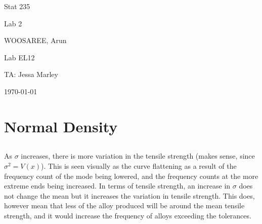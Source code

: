\documentclass[letterpaper]{article}
\begin{document}
\begin{titlepage}
 \begin{center}
  \vspace*{1cm}
  \Huge
  Stat 235
  \vspace{1cm}
  
  Lab 2
  \vspace{1cm}
  
  WOOSAREE, Arun
  \vspace{1cm}
  
  \Huge
  Lab EL12
  \vspace{1cm}
  
  TA: Jessa Marley
  \vspace{1cm}
  
  \today
  \vfill
 \end{center}
\end{titlepage}

\section{Normal Density}

\subsection{}%



As $\sigma$ increases, there is more variation in the tensile strength (makes
sense, since $\sigma^2=V(x)$). This is seen visually as the curve flattening as
a result of the frequency count of the mode being lowered, and the frequency
counts at the more extreme ends being increased. In terms of tensile strength,
an increase in $\sigma$ does not change the mean but it increases the variation
in tensile strength. This does, however mean that less of the alloy produced
will be around the mean tensile strength, and it would increase the frequency of
alloys exceeding the tolerances.

\subsection{}%
\end{document}
